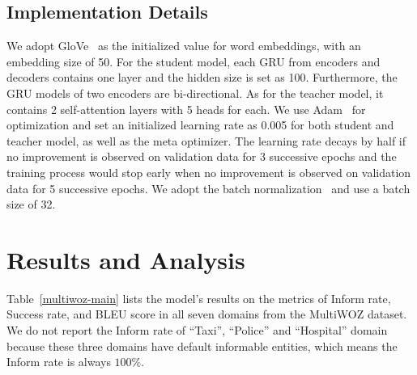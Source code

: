 \documentclass[letterpaper]{article} %
\begin{document}
\subsection*{Implementation Details}
We adopt GloVe~\citep{pennington2014glove} as the initialized value for word embeddings, with an embedding size of 50. For the student model, each GRU from encoders and decoders contains one layer and the hidden size is set as 100. Furthermore, the GRU models of two encoders are bi-directional. As for the teacher model, it contains 2 self-attention layers with 5 heads for each. We use Adam~\citep{kingma2014adam} for optimization and set an initialized learning rate as 0.005 for both student and teacher model, as well as the meta optimizer. The learning rate decays by half if no improvement is observed on validation data for 3 successive epochs and the training process would stop early when no improvement is observed on validation data for 5 successive epochs. We adopt the batch normalization~\citep{ioffe2015batch} and use a batch size of 32.









\section*{Results and Analysis}

Table~\ref{multiwoz-main} lists the model's results on the metrics of Inform rate, Success rate, and BLEU score in all seven domains from the MultiWOZ dataset. We do not report the Inform rate of ``Taxi'', ``Police'' and ``Hospital'' domain because these three domains have default informable entities, which means the Inform rate is always $100\%$.
\end{document}
